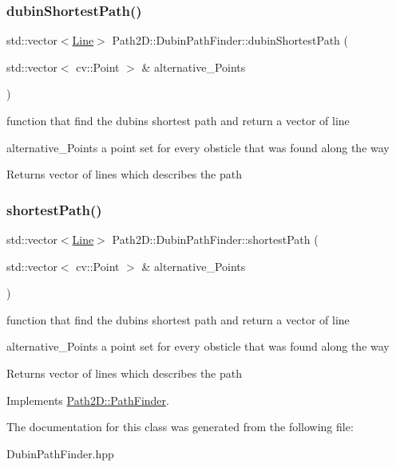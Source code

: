 \subsubsection{\texorpdfstring{dubin\+Shortest\+Path()}{dubinShortestPath()}}
{\footnotesize\ttfamily std\+::vector$<$\mbox{\hyperlink{class_path2_d_1_1_element_1_1_line}{Line}}$>$ Path2\+D\+::\+Dubin\+Path\+Finder\+::dubin\+Shortest\+Path (\begin{DoxyParamCaption}\item[{std\+::vector$<$ cv\+::\+Point $>$ \&}]{alternative\+\_\+\+Points }\end{DoxyParamCaption})}



function that find the dubins shortest path and return a vector of line 

\begin{DoxyItemize}
\item alternative\+\_\+\+Points a point set for every obsticle that was found along the way \begin{DoxyReturn}{Returns}
vector of lines which describes the path 
\end{DoxyReturn}
\end{DoxyItemize}
\mbox{\label{class_path2_d_1_1_dubin_path_finder_a53d6ee86e364b403274f403af6e5088e}} 
\subsubsection{\texorpdfstring{shortest\+Path()}{shortestPath()}}
{\footnotesize\ttfamily std\+::vector$<$\mbox{\hyperlink{class_path2_d_1_1_element_1_1_line}{Line}}$>$ Path2\+D\+::\+Dubin\+Path\+Finder\+::shortest\+Path (\begin{DoxyParamCaption}\item[{std\+::vector$<$ cv\+::\+Point $>$ \&}]{alternative\+\_\+\+Points }\end{DoxyParamCaption})\hspace{0.3cm}{\ttfamily [virtual]}}



function that find the dubins shortest path and return a vector of line 

\begin{DoxyItemize}
\item alternative\+\_\+\+Points a point set for every obsticle that was found along the way \begin{DoxyReturn}{Returns}
vector of lines which describes the path 
\end{DoxyReturn}
\end{DoxyItemize}


Implements \mbox{\hyperlink{class_path2_d_1_1_path_finder_a5d050326067c313925d87ac37612a181}{Path2\+D\+::\+Path\+Finder}}.



The documentation for this class was generated from the following file\+:\begin{DoxyCompactItemize}
\item 
Dubin\+Path\+Finder.\+hpp\end{DoxyCompactItemize}
